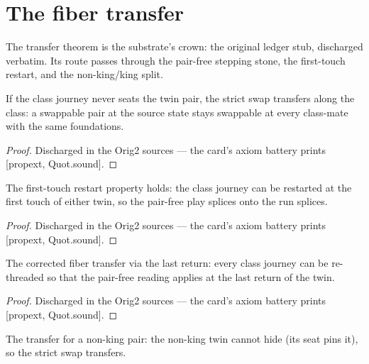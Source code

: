 \section{The fiber transfer}

The transfer theorem is the substrate's crown: the original ledger
stub, discharged verbatim.  Its route passes through the pair-free
stepping stone, the first-touch restart, and the non-king/king
split.

\begin{theorem}\label{thm:pairFree}
\leanok
{}
If the class journey never seats the twin pair, the strict swap
transfers along the class: a swappable pair at the source state
stays swappable at every class-mate with the same foundations.
\end{theorem}

\begin{proof}
\leanok
Discharged in the Orig2 sources --- the card's axiom battery prints [propext, Quot.sound].
\end{proof}

\begin{theorem}\label{thm:firstTouch}
\leanok
{}
The first-touch restart property holds: the class journey can be
restarted at the first touch of either twin, so the pair-free
play splices onto the run splices.
\end{theorem}

\begin{proof}
\leanok
Discharged in the Orig2 sources --- the card's axiom battery prints [propext, Quot.sound].
\end{proof}

\begin{theorem}\label{thm:lastReturn}
\leanok
{}
The corrected fiber transfer via the last return: every class
journey can be re-threaded so that the pair-free reading applies
at the last return of the twin.
\end{theorem}

\begin{proof}
\leanok
Discharged in the Orig2 sources --- the card's axiom battery prints [propext, Quot.sound].
\end{proof}

\begin{theorem}\label{thm:nonking}
\leanok
{}
The transfer for a non-king pair: the non-king twin cannot hide
(its seat pins it), so the strict swap transfers.
\end{theorem}

